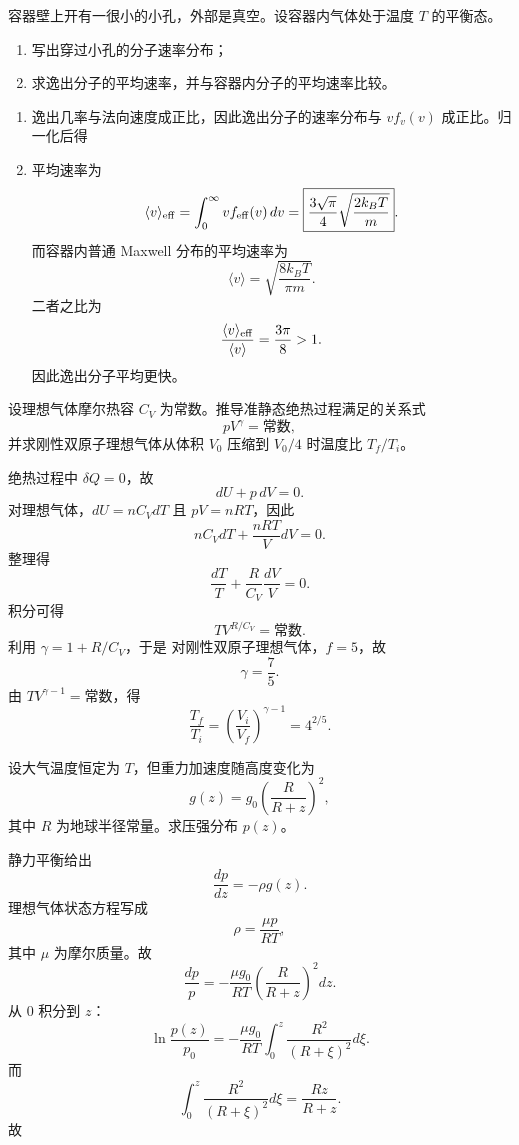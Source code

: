 \begin{question}
容器壁上开有一很小的小孔，外部是真空。设容器内气体处于温度 $T$ 的平衡态。
\begin{enumerate}[label=(\arabic*),leftmargin=2.8em,itemsep=0.2em]
\item 写出穿过小孔的分子速率分布；
\item 求逸出分子的平均速率，并与容器内分子的平均速率比较。
\end{enumerate}
\begin{solution}

\begin{enumerate}[label=(\arabic*),leftmargin=2.8em,itemsep=0.2em]
\item 逸出几率与法向速度成正比，因此逸出分子的速率分布与 $v f_v(v)$ 成正比。归一化后得

\item 平均速率为
\[
\langle v\rangle_{\rm eff}=\int_0^{\infty}v f_{\rm eff}(v)\,dv
=\boxed{\frac{3\sqrt\pi}{4}\sqrt{\frac{2k_BT}{m}}}.
\]
而容器内普通 Maxwell 分布的平均速率为
\[
\langle v\rangle=\sqrt{\frac{8k_BT}{\pi m}}.
\]
二者之比为
\[
\frac{\langle v\rangle_{\rm eff}}{\langle v\rangle}=\frac{3\pi}{8}>1.
\]
因此逸出分子平均更快。
\end{enumerate}
\end{solution}
\end{question}

\begin{question}
设理想气体摩尔热容 $C_V$ 为常数。推导准静态绝热过程满足的关系式
\[
pV^{\gamma}=\text{常数},
\]
并求刚性双原子理想气体从体积 $V_0$ 压缩到 $V_0/4$ 时温度比 $T_f/T_i$。
\begin{solution}

绝热过程中 $\delta Q=0$，故
\[
dU+p\,dV=0.
\]
对理想气体，$dU=nC_VdT$ 且 $pV=nRT$，因此
\[
nC_VdT+\frac{nRT}{V}dV=0.
\]
整理得
\[
\frac{dT}{T}+\frac{R}{C_V}\frac{dV}{V}=0.
\]
积分可得
\[
TV^{R/C_V}=\text{常数}.
\]
利用 $\gamma=1+R/C_V$，于是
对刚性双原子理想气体，$f=5$，故
\[
\gamma=\frac75.
\]
由 $TV^{\gamma-1}=\text{常数}$，得
\[
\frac{T_f}{T_i}=\left(\frac{V_i}{V_f}\right)^{\gamma-1}=4^{2/5}.
\]

\end{solution}
\end{question}

\begin{question}
设大气温度恒定为 $T$，但重力加速度随高度变化为
\[
g(z)=g_0\left(\frac{R}{R+z}\right)^2,
\]
其中 $R$ 为地球半径常量。求压强分布 $p(z)$。
\begin{solution}

静力平衡给出
\[
\frac{dp}{dz}=-\rho g(z).
\]
理想气体状态方程写成
\[
\rho=\frac{\mu p}{RT},
\]
其中 $\mu$ 为摩尔质量。故
\[
\frac{dp}{p}=-\frac{\mu g_0}{RT}\left(\frac{R}{R+z}\right)^2dz.
\]
从 $0$ 积分到 $z$：
\[
\ln\frac{p(z)}{p_0}=-\frac{\mu g_0}{RT}\int_0^z\frac{R^2}{(R+\xi)^2}d\xi.
\]
而
\[
\int_0^z\frac{R^2}{(R+\xi)^2}d\xi=\frac{Rz}{R+z}.
\]
故
\end{solution}
\end{question}


